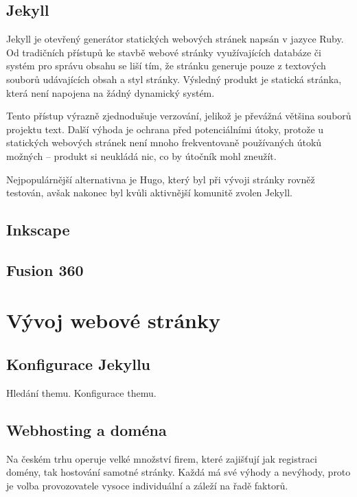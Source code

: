\documentclass[a4paper, 12pt]{article}
\begin{document}
  \subsection{Jekyll} \label{sec:Jekyll}
  Jekyll je otevřený\cite{jekyll-source} generátor statických webových stránek napsán v jazyce Ruby. Od tradičních přístupů ke stavbě webové stránky využívajících databáze či systém pro správu obsahu se liší tím, že stránku generuje pouze z textových souborů udávajících obsah a styl stránky. Výsledný produkt je statická stránka, která není napojena na žádný dynamický systém.

  Tento přístup výrazně zjednodušuje verzování, jelikož je převážná většina souborů projektu text. Další výhoda je ochrana před potenciálními útoky, protože u statických webových stránek není mnoho frekventovaně používaných útoků možných -- produkt si neukládá nic, co by útočník mohl zneužít.

  Nejpopulárnější alternativna je Hugo, který byl při vývoji stránky rovněž testován, avšak nakonec byl kvůli aktivnější komunitě zvolen Jekyll.


  \subsection{Inkscape} \label{sec:Inkscape}

  \subsection{Fusion 360}


  \section{Vývoj webové stránky}

  \subsection{Konfigurace Jekyllu}
  Hledání themu.
  Konfigurace themu.

  \subsection{Webhosting a doména} \label{sec:Webhosting a doména}
  Na českém trhu operuje velké množství firem, které zajišťují jak registraci domény, tak hostování samotné stránky. Každá má své výhody a nevýhody, proto je volba provozovatele vysoce individuální a záleží na řadě faktorů.
\end{document}
